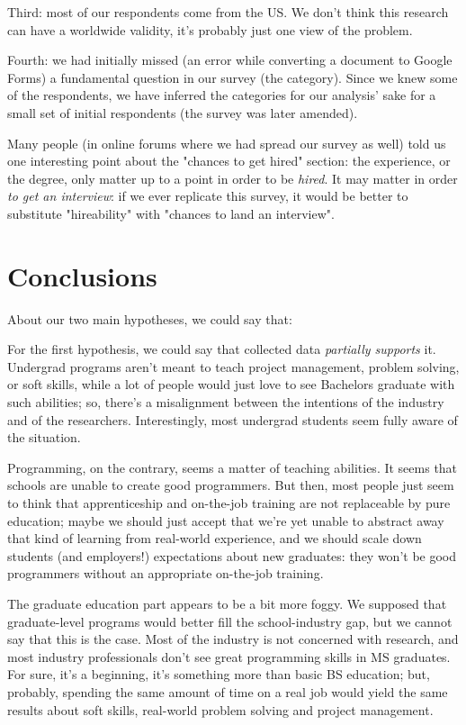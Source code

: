 \documentclass{sigchi}
\begin{document}
Third: most of our respondents come from the US. We don't think this research can have a worldwide validity, it's probably just one view of the problem.\newline

Fourth: we had initially missed (an error while converting a document to Google Forms) a fundamental question in our survey (the category). Since we knew some of the respondents, we have inferred the categories for our analysis' sake for a small set of initial respondents (the survey was later amended).\newline

Many people (in online forums where we had spread our survey as well) told us one interesting point about the "chances to get hired" section: the experience, or the degree, only matter up to a point in order to be \textit{hired}. It may matter in order \textit{to get an interview}: if we ever replicate this survey, it would be better to substitute "hireability" with "chances to land an interview".

\section{Conclusions}
About our two main hypotheses, we could say that:

For the first hypothesis, we could say that collected data \textit{partially supports} it. Undergrad programs aren't meant to teach project management, problem solving, or soft skills, while a lot of people would just love to see Bachelors graduate with such abilities; so, there's a misalignment between the intentions of the industry and of the researchers. Interestingly, most undergrad students seem fully aware of the situation.

Programming, on the contrary, seems a matter of teaching abilities. It seems that schools are unable to create good programmers. But then, most people just seem to think that apprenticeship and on-the-job training are not replaceable by pure education; maybe we should just accept that we're yet unable to abstract away that kind of learning from real-world experience, and we should scale down students (and employers!) expectations about new graduates: they won't be good programmers without an appropriate on-the-job training.

The graduate education part appears to be a bit more foggy. We supposed that graduate-level programs would better fill the school-industry gap, but we cannot say that this is the case. Most of the industry is not concerned with research, and most industry professionals don't see great programming skills in MS graduates. For sure, it's a beginning, it's something more than basic BS education; but, probably, spending the same amount of time on a real job would yield the same results about soft skills, real-world problem solving and project management.
\end{document}
